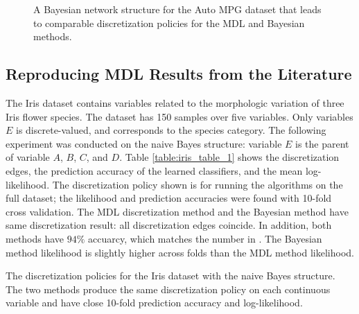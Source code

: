 \begin{figure}[ht]
  \centering
  \scalebox{0.8}{}
  \caption{A Bayesian network structure for the Auto MPG dataset that leads to comparable discretization policies for the MDL and Bayesian methods.}
  \label{fig:auto_graph_3}
\end{figure}

\begin{table}[ht]
  \centering
  \caption{
    The discretization policies for the Auto MPG dataset with the fixed structure shown in Figure~\ref{fig:auto_graph_3}.
    The methods have the same discretization for variable $A$, and the log-likelihood for the Bayesian method is only slightly better than that for the MDL method.
  }

  \label{table:auto_disc_table_3}
\end{table}

\subsection*{Reproducing MDL Results from the Literature}

The Iris dataset contains variables related to the morphologic variation of three Iris flower species.
The dataset has \num{150} samples over five variables.
Only variables $E$ is discrete-valued, and corresponds to the species category.
The following experiment was conducted on the naive Bayes structure: variable $E$ is the parent of variable $A$, $B$, $C$, and $D$. Table \ref{table:iris_table_1} shows the discretization edges, the prediction accuracy of the learned classifiers, and the mean log-likelihood.
The discretization policy shown is for running the algorithms on the full dataset; the likelihood and prediction accuracies were found with 10-fold cross validation.
The MDL discretization method and the Bayesian method have same discretization result: all discretization edges coincide. In addition, both methods have $94 \%$ accuarcy, which matches the number in \cite{Friedman_1996}.
The Bayesian method likelihood is slightly higher across folds than the MDL method likelihood.

\begin{table}[ht]
  \centering
  \caption{
    The discretization policies for the Iris dataset with the naive Bayes structure.
    The two methods produce the same discretization policy on each continuous variable and have close 10-fold prediction accuracy and log-likelihood.
  }

  \label{table:iris_table_1}
\end{table}



